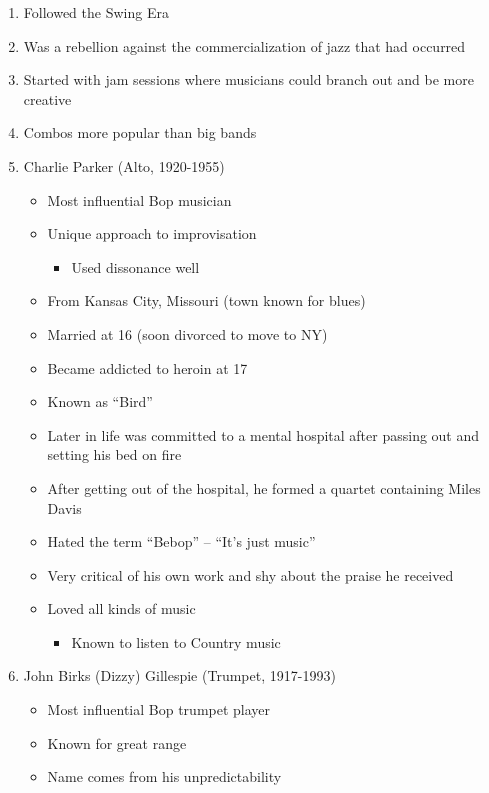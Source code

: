 \documentclass[]{article}
\providecommand{\tightlist}{%
  \setlength{\itemsep}{0pt}\setlength{\parskip}{0pt}}
\begin{document}
\begin{enumerate}
\def\labelenumi{\arabic{enumi}.}
\tightlist
\item
  Followed the Swing Era
\item
  Was a rebellion against the commercialization of jazz that had
  occurred
\item
  Started with jam sessions where musicians could branch out and be more
  creative
\item
  Combos more popular than big bands
\item
  Charlie Parker (Alto, 1920-1955)

  \begin{itemize}
  \tightlist
  \item
    Most influential Bop musician
  \item
    Unique approach to improvisation

    \begin{itemize}
    \tightlist
    \item
      Used dissonance well
    \end{itemize}
  \item
    From Kansas City, Missouri (town known for blues)
  \item
    Married at 16 (soon divorced to move to NY)
  \item
    Became addicted to heroin at 17
  \item
    Known as ``Bird''
  \item
    Later in life was committed to a mental hospital after passing out
    and setting his bed on fire
  \item
    After getting out of the hospital, he formed a quartet containing
    Miles Davis
  \item
    Hated the term ``Bebop'' -- ``It's just music''
  \item
    Very critical of his own work and shy about the praise he received
  \item
    Loved all kinds of music

    \begin{itemize}
    \tightlist
    \item
      Known to listen to Country music
    \end{itemize}
  \end{itemize}
\item
  John Birks (Dizzy) Gillespie (Trumpet, 1917-1993)

  \begin{itemize}
  \tightlist
  \item
    Most influential Bop trumpet player
  \item
    Known for great range
  \item
    Name comes from his unpredictability


\end{itemize}
\end{enumerate}
\end{document}

